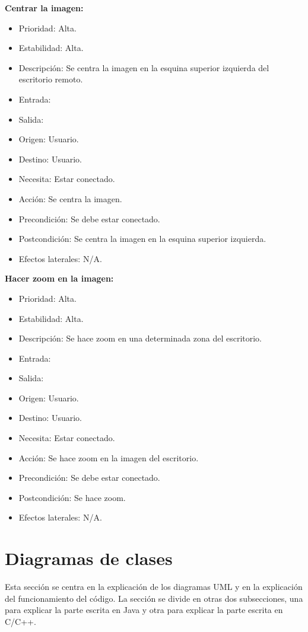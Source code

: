 \textbf{Centrar la imagen:}
\begin{itemize}
\item Prioridad: Alta.
\item Estabilidad: Alta.
\item Descripción: Se centra la imagen en la esquina superior izquierda del escritorio remoto.
\item Entrada:
\item Salida:
\item Origen: Usuario.
\item Destino: Usuario.
\item Necesita: Estar conectado.
\item Acción: Se centra la imagen.
\item Precondición: Se debe estar conectado.
\item Postcondición: Se centra la imagen en la esquina superior izquierda.
\item Efectos laterales: N/A.\\

\end{itemize}

\textbf{Hacer zoom en la imagen:}
\begin{itemize}
\item Prioridad: Alta.
\item Estabilidad: Alta.
\item Descripción: Se hace zoom en una determinada zona del escritorio.
\item Entrada:
\item Salida:
\item Origen: Usuario.
\item Destino: Usuario.
\item Necesita: Estar conectado.
\item Acción: Se hace zoom en la imagen del escritorio.
\item Precondición: Se debe estar conectado.
\item Postcondición: Se hace zoom.
\item Efectos laterales: N/A.\\

\end{itemize}

\section {Diagramas de clases}

Esta sección se centra en la explicación de los diagramas UML y en la explicación del funcionamiento del código. La sección se divide en otras dos subsecciones, una para explicar la parte escrita en Java y otra para explicar la parte escrita en C/C++.\\

